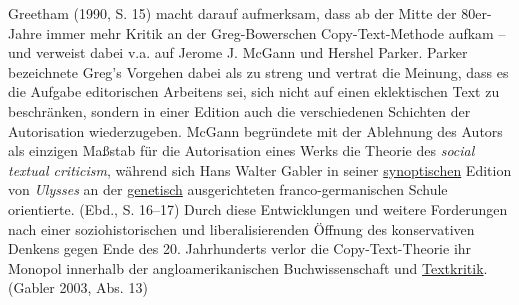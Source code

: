 \documentclass{article}
\begin{document}
        Greetham (1990, S. 15) macht darauf aufmerksam, dass ab der Mitte der
                  80er-Jahre immer mehr Kritik an der Greg-Bowerschen Copy-Text-Methode aufkam – und
                  verweist dabei v.a. auf Jerome J. McGann und Hershel Parker. Parker bezeichnete
                  Greg’s Vorgehen dabei als zu streng und vertrat die Meinung, dass es die Aufgabe
                  editorischen Arbeitens sei, sich nicht auf einen eklektischen Text zu beschränken,
                  sondern in einer Edition auch die verschiedenen Schichten der Autorisation
                  wiederzugeben. McGann begründete mit der Ablehnung des Autors als einzigen Maßstab
                  für die Autorisation eines Werks die Theorie des \emph{social textual
                     criticism}, während sich Hans Walter Gabler in seiner \href{http://gams.uni-graz.at/o:konde.174}{synoptischen} Edition von \emph{Ulysses} an der \href{http://gams.uni-graz.at/o:konde.28}{genetisch}
                  ausgerichteten franco-germanischen Schule orientierte. (Ebd., S.
                     16–17) Durch diese Entwicklungen und weitere Forderungen nach einer
                  soziohistorischen und liberalisierenden Öffnung des konservativen Denkens gegen
                  Ende des 20. Jahrhunderts verlor die Copy-Text-Theorie ihr Monopol innerhalb der
                  angloamerikanischen Buchwissenschaft und \href{http://gams.uni-graz.at/o:konde.192}{Textkritik}. (Gabler 2003, Abs. 13)\\
            
\end{document}
